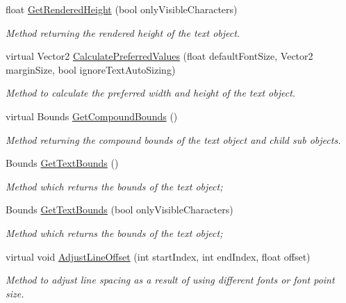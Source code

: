 \begin{DoxyCompactItemize}
float \mbox{\hyperlink{class_t_m_pro_1_1_t_m_p___text_ac94f45240acb3ae89c3c2a70437030ce}{Get\+Rendered\+Height}} (bool only\+Visible\+Characters)
\begin{DoxyCompactList}\small\item\em Method returning the rendered height of the text object. \end{DoxyCompactList}\item 
virtual Vector2 \mbox{\hyperlink{class_t_m_pro_1_1_t_m_p___text_a238e31eb1178a4793a7a7f9b624341c3}{Calculate\+Preferred\+Values}} (float default\+Font\+Size, Vector2 margin\+Size, bool ignore\+Text\+Auto\+Sizing)
\begin{DoxyCompactList}\small\item\em Method to calculate the preferred width and height of the text object. \end{DoxyCompactList}\item 
virtual Bounds \mbox{\hyperlink{class_t_m_pro_1_1_t_m_p___text_a0628c368c630a855a7001344fca270ba}{Get\+Compound\+Bounds}} ()
\begin{DoxyCompactList}\small\item\em Method returning the compound bounds of the text object and child sub objects. \end{DoxyCompactList}\item 
Bounds \mbox{\hyperlink{class_t_m_pro_1_1_t_m_p___text_a283ef3decc85a36d428cbc270647dde6}{Get\+Text\+Bounds}} ()
\begin{DoxyCompactList}\small\item\em Method which returns the bounds of the text object; \end{DoxyCompactList}\item 
Bounds \mbox{\hyperlink{class_t_m_pro_1_1_t_m_p___text_a06813292362ae8e0c09c214dca0b570a}{Get\+Text\+Bounds}} (bool only\+Visible\+Characters)
\begin{DoxyCompactList}\small\item\em Method which returns the bounds of the text object; \end{DoxyCompactList}\item 
virtual void \mbox{\hyperlink{class_t_m_pro_1_1_t_m_p___text_af8260f3fbff0d9e0354ce053de51f085}{Adjust\+Line\+Offset}} (int start\+Index, int end\+Index, float offset)
\begin{DoxyCompactList}\small\item\em Method to adjust line spacing as a result of using different fonts or font point size. \end{DoxyCompactList}\item 

\end{DoxyCompactItemize}
